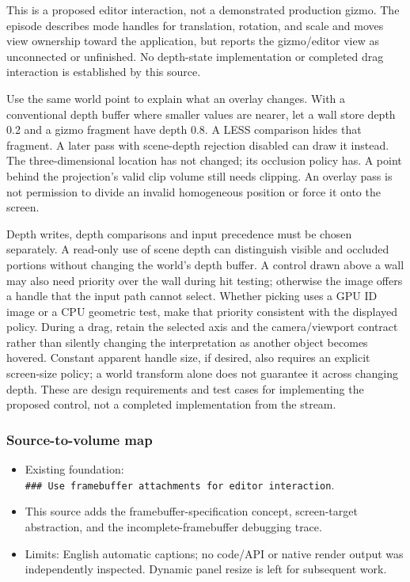 This is a proposed editor interaction, not a demonstrated production gizmo. The episode describes mode handles for translation, rotation, and scale and moves view ownership toward the application, but reports the gizmo/editor view as unconnected or unfinished. No depth-state implementation or completed drag interaction is established by this source.

Use the same world point to explain what an overlay changes. With a conventional depth buffer where smaller values are nearer, let a wall store depth 0.2 and a gizmo fragment have depth 0.8. A LESS comparison hides that fragment. A later pass with scene-depth rejection disabled can draw it instead. The three-dimensional location has not changed; its occlusion policy has. A point behind the projection's valid clip volume still needs clipping. An overlay pass is not permission to divide an invalid homogeneous position or force it onto the screen.

Depth writes, depth comparisons and input precedence must be chosen separately. A read-only use of scene depth can distinguish visible and occluded portions without changing the world's depth buffer. A control drawn above a wall may also need priority over the wall during hit testing; otherwise the image offers a handle that the input path cannot select. Whether picking uses a GPU ID image or a CPU geometric test, make that priority consistent with the displayed policy. During a drag, retain the selected axis and the camera/viewport contract rather than silently changing the interpretation as another object becomes hovered. Constant apparent handle size, if desired, also requires an explicit screen-size policy; a world transform alone does not guarantee it across changing depth. These are design requirements and test cases for implementing the proposed control, not a completed implementation from the stream.

\subsubsection{Source-to-volume map}\label{06-engine-ii-ch032-source-to-volume-map-4}

\hypertarget{06-engine-ii-ch032-source-to-volume-map-4}{}

\begin{itemize}
\tightlist
\item
  Existing foundation: \texttt{\#\#\#\ Use\ framebuffer\ attachments\ for\ editor\ interaction}.
\item
  This source adds the framebuffer-specification concept, screen-target abstraction, and the incomplete-framebuffer debugging trace.
\item
  Limits: English automatic captions; no code/API or native render output was independently inspected. Dynamic panel resize is left for subsequent work.
\end{itemize}


